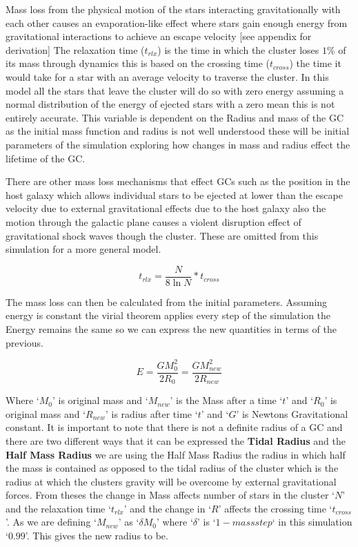 \documentclass[%
 aip,
 jmp,%
 amsmath,amssymb,
 reprint,%
]{revtex4-1}
\begin{document}
Mass loss from the physical motion of the stars interacting gravitationally with each other causes an evaporation-like effect where stars gain enough energy from gravitational interactions to achieve an escape velocity [see appendix for derivation] The relaxation time ($t_{rlx}$) is the time in which the cluster loses $1\%$ of its mass through dynamics this is based on the crossing time ($t_{cross}$) the time it would take for a star with an average velocity to traverse the cluster. In this model all the stars that leave the cluster will do so with zero energy assuming a normal distribution of the energy of ejected stars with a zero mean this is not entirely accurate. This variable is dependent on the Radius and mass of the GC as the initial mass function and radius is not well understood these will be initial parameters of the simulation exploring how changes in mass and radius effect the lifetime of the GC. 

There are other mass loss mechanisms that effect GCs such as the position in the host galaxy which allows individual stars to be ejected at lower than the escape velocity due to external gravitational effects due to the host galaxy also the motion through the galactic plane causes a violent disruption effect of gravitational shock waves though the cluster. These are omitted from this simulation for a more general model.

\begin{equation}
  t_{rlx}= \frac{N}{8 \ln N}* t_{cross} \label{trelax}
\end{equation}

The mass loss can then be calculated from the initial parameters. Assuming energy is constant the virial theorem applies every step of the simulation the Energy remains the same so we can express the new quantities in terms of the previous.

\begin{equation}
  E=\frac{GM_{0}^{2}}{2R_{0}}=\frac{GM_{new}^{2}}{2R_{new}}
\label{energymass}
\end{equation}

Where `$M_{0}$' is original mass and `$M_{new}$' is the Mass after a time `$t$' and `$R_{0}$' is original mass and `$R_{new}$' is radius after time `$t$' and `$G$' is Newtons Gravitational constant. It is important to note that there is not a definite radius of a GC and there are two different ways that it can be expressed the \textbf{Tidal Radius} and the \textbf{Half Mass Radius} we are using the Half Mass Radius the radius in which half the mass is contained as opposed to the tidal radius of the cluster which is the radius at which the clusters gravity will be overcome by external gravitational forces. From theses the change in Mass affects number of stars in the cluster `$N$' and the relaxation time `$t_{rlx}$' and the change in `$R$' affects the crossing time `$t_{cross}$'. As we are defining `$M_{new}$' as `$ \delta M_{0}$' where `$\delta$' is `$1-mass step$` in this simulation `$0.99$'. This gives the new radius to be.
\end{document}
